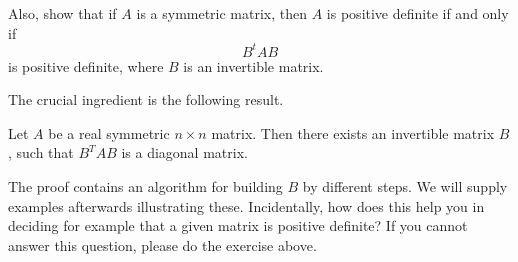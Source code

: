 \documentclass{article}
\begin{document}
Also, show that if $A$ is a symmetric matrix, then $A$ is
positive definite if and only if
$$
B^t A B
$$
is positive definite, where $B$ is an invertible matrix.
\endshex

The crucial ingredient is the following result.

\begin{theorem}[emph]\label{thmsymred}
  Let $A$ be a real symmetric $n\times n$ matrix. Then there exists an
  invertible matrix $B$, such that $B^T A B$ is a diagonal matrix.
\end{theorem}

The proof contains an algorithm for building $B$ by different steps.
We will supply examples afterwards illustrating these. Incidentally,
how does this help you in deciding for example that a given matrix
is positive definite? If you cannot answer this question, please
do the exercise above.
\end{document}
